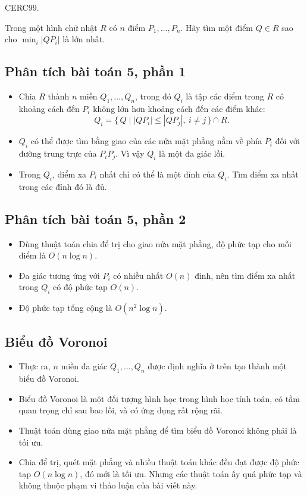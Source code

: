 \documentclass[11pt]{article}
\begin{document}
CERC99.

Trong một hình chữ nhật \(R\) có \(n\) điểm \(P_1,\ldots,P_n\). Hãy tìm một
điểm \(Q\in R\) sao cho \(\min_i |QP_i|\) là lớn nhất.

\subsection*{Phân tích bài toán 5, phần 1}

\begin{itemize}
  \item Chia \(R\) thành \(n\) miền \(Q_1,\ldots,Q_n\), trong đó \(Q_i\) là
  tập các điểm trong \(R\) có khoảng cách đến \(P_i\) không lớn hơn khoảng
  cách đến các điểm khác:
  \[
    Q_i=\{\,Q\mid |QP_i|\le |QP_j|,\ i\ne j\,\}\cap R.
  \]
  \item \(Q_i\) có thể được tìm bằng giao của các nửa mặt phẳng nằm về phía
  \(P_i\) đối với đường trung trực của \(P_iP_j\). Vì vậy \(Q_i\) là một đa
  giác lồi.
  \item Trong \(Q_i\), điểm xa \(P_i\) nhất chỉ có thể là một đỉnh của
  \(Q_i\). Tìm điểm xa nhất trong các đỉnh đó là đủ.
\end{itemize}

\subsection*{Phân tích bài toán 5, phần 2}

\begin{itemize}
  \item Dùng thuật toán chia để trị cho giao nửa mặt phẳng, độ phức tạp cho
  mỗi điểm là \(O(n\log n)\).
  \item Đa giác tương ứng với \(P_i\) có nhiều nhất \(O(n)\) đỉnh, nên tìm
  điểm xa nhất trong \(Q_i\) có độ phức tạp \(O(n)\).
  \item Độ phức tạp tổng cộng là \(O(n^2\log n)\).
\end{itemize}

\subsection*{Biểu đồ Voronoi}

\begin{itemize}
  \item Thực ra, \(n\) miền đa giác \(Q_1,\ldots,Q_n\) được định nghĩa ở trên
  tạo thành một biểu đồ Voronoi.
  \item Biểu đồ Voronoi là một đối tượng hình học trong hình học tính toán,
  có tầm quan trọng chỉ sau bao lồi, và có ứng dụng rất rộng rãi.
  \item Thuật toán dùng giao nửa mặt phẳng để tìm biểu đồ Voronoi không phải
  là tối ưu.
  \item Chia để trị, quét mặt phẳng và nhiều thuật toán khác đều đạt được độ
  phức tạp \(O(n\log n)\), đó mới là tối ưu. Nhưng các thuật toán ấy quá phức
  tạp và không thuộc phạm vi thảo luận của bài viết này.
\end{itemize}
\end{document}
